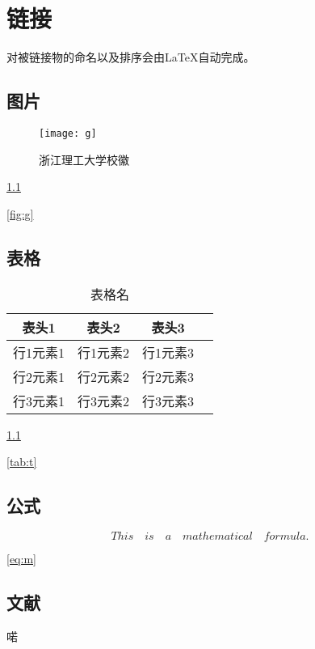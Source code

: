 \chapter{链接}

对被链接物的命名以及排序会由LaTeX自动完成。

\section{图片}

\begin{figure}[H]
    \centering
    \texttt{[image: g]}  %
    \caption{浙江理工大学校徽}  %
    \label{fig:g}  %
\end{figure}

\cref{fig:g}

\autoref{fig:g}  %

\section{表格}

\begin{table}[htbp]
    \caption{表格名}  %
    \label{tab:t}  %
    \centering
    \begin{tabular}{c c c c}
        \hline
        表头1   & 表头2   & 表头3   \\
        \hline
        行1元素1 & 行1元素2 & 行1元素3 \\
        行2元素1 & 行2元素2 & 行2元素3 \\
        行3元素1 & 行3元素2 & 行3元素3 \\
        \hline
    \end{tabular}
\end{table}

\cref{tab:t}

\autoref{tab:t}  %

\section{公式}

\begin{equation}
    \label{eq:m}
    This \quad is \quad a \quad mathematical \quad formula.
\end{equation}

\ref{eq:m}

\section{文献}

喏\cite{vaswani_attention_2023}
